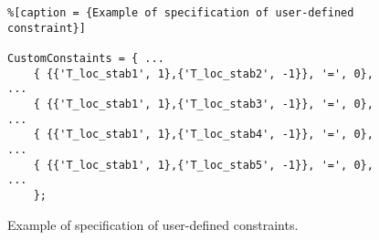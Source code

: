 \begin{figure}
{\smaller
\begin{lstlisting}%[caption = {Example of specification of user-defined constraint}]

CustomConstaints = { ...
    { {{'T_loc_stab1', 1},{'T_loc_stab2', -1}}, '=', 0}, ...
    { {{'T_loc_stab1', 1},{'T_loc_stab3', -1}}, '=', 0}, ...
    { {{'T_loc_stab1', 1},{'T_loc_stab4', -1}}, '=', 0}, ...
    { {{'T_loc_stab1', 1},{'T_loc_stab5', -1}}, '=', 0}, ...
    };
\end{lstlisting}}
\caption{Example of specification of user-defined constraints.
}
\label{fig:user_constraints}
\end{figure}
